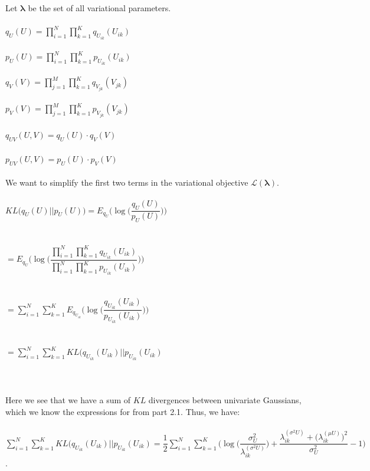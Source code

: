 \documentclass[submit]{harvardml}
\theoremstyle{plain}
\begin{document}
\begin{enumerate}[label=2.\arabic*.]
Let $\bm{\lambda}$ be the set of all variational parameters.\\\\
$q_U(U)=\displaystyle\prod_{i=1}^N\displaystyle\prod_{k=1}^Kq_{U_{ik}}(U_{ik})$\\\\
$p_U(U)=\displaystyle\prod_{i=1}^N\displaystyle\prod_{k=1}^Kp_{U_{ik}}(U_{ik})$\\\\
$q_V(V)=\displaystyle\prod_{j=1}^M\displaystyle\prod_{k=1}^Kq_{V_{jk}}(V_{jk})$\\\\
$p_V(V)=\displaystyle\prod_{j=1}^M\displaystyle\prod_{k=1}^Kp_{V_{jk}}(V_{jk})$\\\\
$q_{UV}(U,V)=q_{U}(U)\cdot q_{V}(V)$\\\\
$p_{UV}(U,V)=p_{U}(U)\cdot p_{V}(V)$\\\\
We want to simplify the first two terms in the variational objective $\mathcal{L}(\bm{\lambda})$.\\\\
$KL\big(q_{U}(U)||p_{U}(U)\big)=E_{q_{U}}\Bigg(\log\bigg(\dfrac{q_{U}(U)}{p_{U}(U)}\bigg)\Bigg)$\\\\\\
$=E_{q_{U}}\Bigg(\log\Bigg(\dfrac{\prod_{i=1}^N\prod_{k=1}^Kq_{U_{ik}}(U_{ik})}{\prod_{i=1}^N\prod_{k=1}^Kp_{U_{ik}}(U_{ik})}\Bigg)\Bigg)$\\\\\\
$=\displaystyle\sum_{i=1}^N\displaystyle\sum_{k=1}^KE_{q_{U_{ik}}}\Bigg(\log\bigg(\dfrac{q_{U_{ik}}(U_{ik})}{p_{U_{ik}}(U_{ik})}\bigg)\Bigg)$\\\\\\
$=\displaystyle\sum_{i=1}^N\displaystyle\sum_{k=1}^KKL(q_{U_{ik}}(U_{ik})||p_{U_{ik}}(U_{ik})$\\\\\\\\
Here we see that we have a sum of $KL$ divergences between univariate Gaussians, which we know the expressions for from part 2.1. Thus, we have:\\\\
$\displaystyle\sum_{i=1}^N\displaystyle\sum_{k=1}^KKL(q_{U_{ik}}(U_{ik})||p_{U_{ik}}(U_{ik})=\dfrac{1}{2}\displaystyle\sum_{i=1}^N\displaystyle\sum_{k=1}^K\Bigg(\log\Bigg(\dfrac{\sigma_U^2}{\lambda_{ik}^{(\sigma^2U)}}\Bigg)+\dfrac{\lambda_{ik}^{(\sigma^2U)}+\Big(\lambda_{ik}^{(\mu U)}\Big)^2}{\sigma_U^2}-1\Bigg)$.\\\\\\

\end{enumerate}
\end{document}
